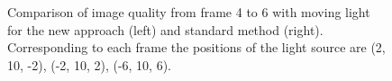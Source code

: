 \begin{figure}
\begin{center}
{\begin{tabular}{c}
\end{tabular}
}%
\renewcommand{\thefigure}{\thechapter.\arabic{figure}}
\caption[Comparison of image quality from frame 4 to 6 with moving light]{Comparison of image quality from frame 4 to 6 with moving light for the new approach (left) and standard method (right). Corresponding to each frame the positions of the light source are (2, 10, -2), (-2, 10, 2), (-6, 10, 6). }
\label{fig:result2_images2}
\end{center}
\end{figure}

\begin{figure}
\begin{center}
\setlength{\tabcolsep}{0mm}
\end{center}
\end{figure}
